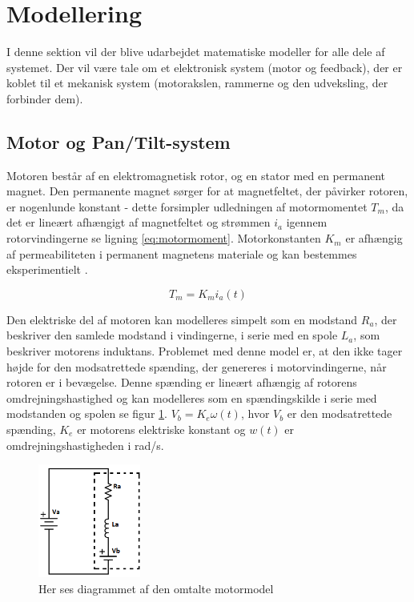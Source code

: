\section{Modellering}\label{section:Modellering}
I denne sektion vil der blive udarbejdet matematiske modeller for alle dele af systemet. Der vil være tale om et elektronisk system (motor og feedback), der er koblet til et mekanisk system (motorakslen, rammerne og den udveksling, der forbinder dem). 

\subsection{Motor og Pan/Tilt-system}
Motoren består af en elektromagnetisk rotor, og en stator med en permanent magnet. Den permanente magnet sørger for at magnetfeltet, der påvirker rotoren, er nogenlunde konstant - dette forsimpler udledningen af motormomentet $T_{m}$, da det er lineært afhængigt af magnetfeltet og strømmen $i_{a}$ igennem rotorvindingerne se ligning \ref{eq:motormoment}. Motorkonstanten $K_{m}$ er afhængig af permeabiliteten i permanent magnetens materiale og kan bestemmes eksperimentielt \cite{azevedo2013}.

\begin{equation}\label{eq:motormoment}
T_{m}=K_{m}i_{a}(t)
\end{equation}

Den elektriske del af motoren kan modelleres simpelt som en modstand $R_{a}$, der beskriver den samlede modstand i vindingerne, i serie med en spole $L_{a}$, som beskriver motorens induktans. Problemet med denne model er, at den ikke tager højde for den modsatrettede spænding, der genereres i motorvindingerne, når rotoren er i bevægelse. Denne spænding er lineært afhængig af rotorens omdrejningshastighed og kan modelleres som en spændingskilde i serie med modstanden og spolen se figur \ref{fig:motor_sch}. $V_{b}=K_{e}\omega(t)$, hvor $V_{b}$ er den modsatrettede spænding, $K_{e}$ er motorens elektriske konstant og $w(t)$ er omdrejningshastigheden i rad/s.\\



\begin{figure}
	\centering
	\includegraphics[width=0.3\textwidth]{Billeder/Motormodel.png}
	\caption{Her ses diagrammet af den omtalte motormodel}
	\label{fig:motor_sch}
\end{figure}

